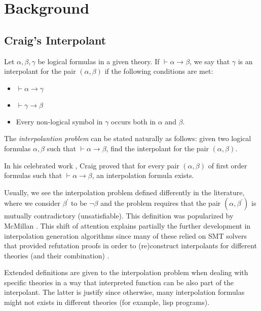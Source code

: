 \documentclass[10pt, sigconf,authordraft]{acmart}
\begin{document}
\section{Background}

\subsection{Craig's Interpolant}

Let $\alpha, \beta, \gamma$ be logical formulas in a given theory. If
$\vdash \alpha \rightarrow \beta$, we say that $\gamma$ is an
interpolant for the pair $(\alpha, \beta)$ if the following conditions
are met:

\begin{itemize}
\item $\vdash \alpha \rightarrow \gamma$
\item $\vdash \gamma \rightarrow \beta$
\item Every non-logical symbol in $\gamma$ occurs both in $\alpha$ and
  $\beta$.
\end{itemize}

The \emph{interpolantion problem} can be stated naturally as follows: given two
logical formulas $\alpha, \beta$ such that $\vdash \alpha \rightarrow \beta$, find
the interpolant for the pair $(\alpha, \beta)$.

In his celebrated work \cite{10.2307/2963594}, Craig proved that for every pair
$(\alpha, \beta)$ of first order formulas such that
$\vdash \alpha \rightarrow \beta$, an interpolation formula exists.

Usually, we see the interpolation problem defined differently in the literature, where
we consider $\beta^{'}$ to be $\neg \beta$ and the problem requires that the pair $(\alpha, \beta^{'})$
is mutually contradictory (unsatisfiable). This definition was popularized by McMillan
\cite{10.1007/978-3-540-24730-2_2}. This shift of attention explains partially the further
development in interpolation generation algorithms since many of these relied on
SMT solvers that provided refutation proofs in order to (re)construct interpolants
for different theories (and their combination) \cite{10.1007/978-3-642-02959-2_17,
  10.1007/978-3-642-36742-7_9, mcmillan2011interpolants}.

Extended definitions are given to the interpolation problem when dealing with specific
theories \cite{10.1007/11532231_26} in a way that interpreted function can be also part of
the interpolant. The latter is justify since otherwise, many interpolation formulas might
not exists in different theories (for example, lisp programs).
\end{document}
